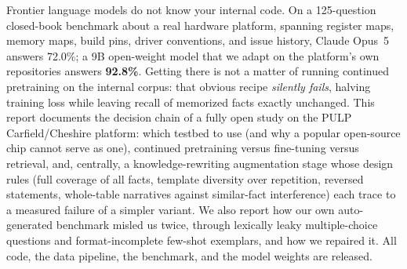 Frontier language models do not know your internal code. On a 125-question
closed-book benchmark about a real hardware platform, spanning register maps,
memory maps, build pins, driver conventions, and issue history, Claude Opus~5
answers 72.0\%; a 9B open-weight model that we adapt on the platform's own
repositories answers \textbf{92.8\%}. Getting there is not a matter of running
continued pretraining on the internal corpus: that obvious recipe
\emph{silently fails}, halving training loss while leaving recall of memorized
facts exactly unchanged. This report documents the decision chain of a fully
open study on the PULP Carfield/Cheshire platform: which testbed to use (and
why a popular open-source chip cannot serve as one), continued pretraining
versus fine-tuning versus retrieval, and, centrally, a knowledge-rewriting
augmentation stage whose design rules (full coverage of all facts, template
diversity over repetition, reversed statements, whole-table narratives against
similar-fact interference) each trace to a measured failure of a simpler
variant. We also report how our own auto-generated benchmark misled us twice,
through lexically leaky multiple-choice questions and format-incomplete
few-shot exemplars, and how we repaired it. All code, the data pipeline, the
benchmark, and the model weights are released.

